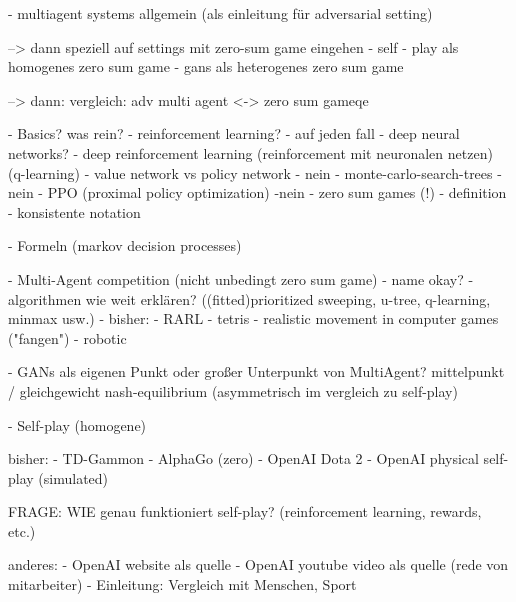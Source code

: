 - multiagent systems allgemein (als einleitung für adversarial setting)

--> dann speziell auf settings mit zero-sum game eingehen
- self - play als homogenes zero sum game
- gans als heterogenes zero sum game

--> dann: vergleich: adv multi agent <-> zero sum gameqe 


- Basics?
was rein?
	- reinforcement learning? - auf jeden fall
    - deep neural networks? - deep reinforcement learning (reinforcement mit neuronalen netzen) (q-learning)
    - value network vs policy network - nein
    - monte-carlo-search-trees - nein
    - PPO (proximal policy optimization) -nein
    - zero sum games (!) - definition - konsistente notation 
    
    - Formeln (markov decision processes)
    

- Multi-Agent competition (nicht unbedingt zero sum game)
	- name okay?
    - algorithmen wie weit erklären? ((fitted)prioritized sweeping, u-tree, q-learning, minmax usw.)
    - bisher:
    	- RARL
        - tetris
        - realistic movement in computer games ("fangen")
        - robotic

- GANs als eigenen Punkt oder großer Unterpunkt von MultiAgent? mittelpunkt / gleichgewicht nash-equilibrium (asymmetrisch im vergleich zu self-play)

- Self-play (homogene)

bisher:
	- TD-Gammon
    - AlphaGo (zero)
    - OpenAI Dota 2
    - OpenAI physical self-play (simulated)
    
    FRAGE: WIE genau funktioniert self-play? (reinforcement learning, rewards, etc.)
    
anderes:
	- OpenAI website als quelle
    - OpenAI youtube video als quelle (rede von mitarbeiter)
    - Einleitung: Vergleich mit Menschen, Sport